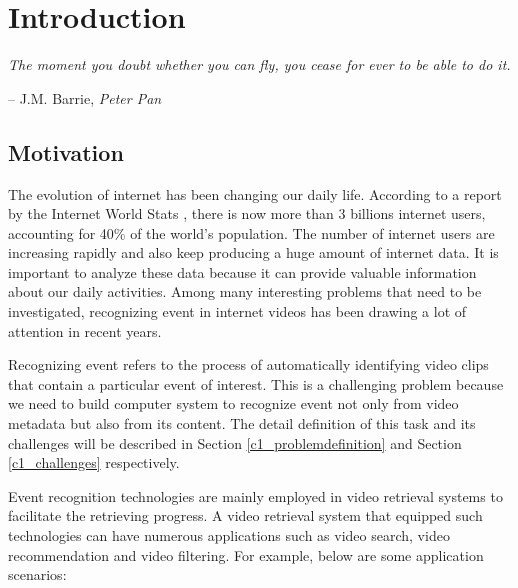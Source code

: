 \chapter{Introduction}
\label{chapter1}

\epigraph{\textit{The moment you doubt whether you can fly, you cease for ever to be able to do it.}}{ -- J.M. Barrie, \textit{Peter Pan}}


\ifpdf
    \graphicspath{{Chapter1/Figs/Raster/}{Chapter1/Figs/PDF/}{Chapter1/Figs/}}
\else
    \graphicspath{{Chapter1/Figs/Vector/}{Chapter1/Figs/}}
\fi

\section{Motivation}
The evolution of internet has been changing our daily life. According to a report by the Internet World Stats \cite{Internet1}, there is now more than 3 billions internet users, accounting for 40\% of the world's population. The number of internet users are increasing rapidly and also keep producing a huge amount of internet data. It is important to analyze these data because it can provide valuable information about our daily activities. Among many interesting problems that need to be investigated, recognizing event in internet videos has been drawing a lot of attention in recent years. 

Recognizing event refers to the process of automatically identifying video clips that contain a particular event of interest. This is a challenging problem because we need to build computer system to recognize event not only from video metadata but also from its content. The detail definition of this task and its challenges will be described in Section \ref{c1_problemdefinition} and Section \ref{c1_challenges} respectively. 

Event recognition technologies are mainly employed in  video retrieval systems to facilitate the retrieving progress. A video retrieval system that equipped such technologies can have numerous applications such as video search, video recommendation and video filtering. For example, below are some application scenarios:

